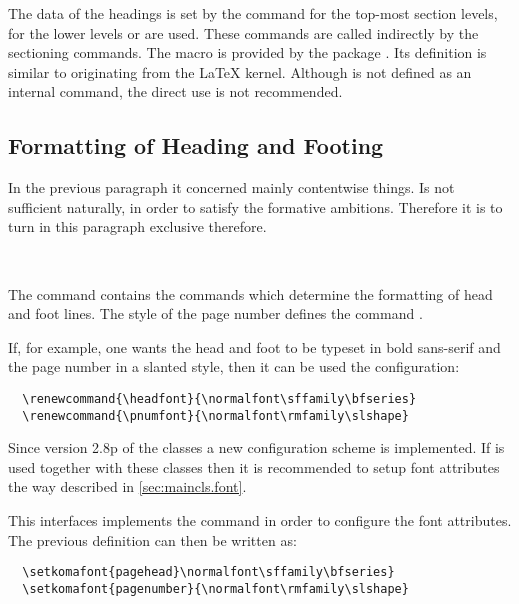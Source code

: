 \begin{Explain}
The data of the headings is set by the command
 for the top-most
section levels, for the lower levels
 or
 are used.
These commands are called indirectly by the sectioning commands.
The macro  is provided by the package
.
Its definition is similar to  originating from
the \LaTeX{} kernel.
Although  is not defined as an internal command,
the direct use is not recommended.
\end{Explain}


\subsection{Formatting of Heading and Footing}
\label{sec:scrpage.basics.format}
In the previous paragraph it concerned mainly contentwise things. Is
not sufficient naturally, in order to satisfy the formative
ambitions. Therefore it is to turn in this paragraph exclusive therefore.
%
\begin{Declaration}
\\
\end{Declaration}%
The command  contains the commands
which determine the formatting of head and foot lines.
The style of the page number defines the command
.
\begin{Example}
If, for example, one wants the head and foot to be typeset in bold
sans-serif and the page number in a slanted style, then it can be
used the configuration:
\begin{lstlisting}
  \renewcommand{\headfont}{\normalfont\sffamily\bfseries}
  \renewcommand{\pnumfont}{\normalfont\rmfamily\slshape}
\end{lstlisting}
\end{Example}
%
Since version 2.8p of the \KOMAScript{} classes a new
configuration scheme is implemented.
If  is used together with these classes then
it is recommended to setup font attributes the way described
in \autoref{sec:maincls.font}.
\begin{Example}
This interfaces implements the command 
in order to configure the font attributes.
The previous definition can then be written as:
\begin{lstlisting}
  \setkomafont{pagehead}\normalfont\sffamily\bfseries}
  \setkomafont{pagenumber}{\normalfont\rmfamily\slshape}
\end{lstlisting}
\end{Example}

